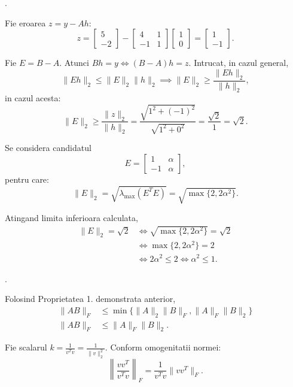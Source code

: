 \begin{demonstratie}

    .

    Fie eroarea $z = y - Ah$:
    $$ z = \begin{bmatrix} 5 \\ -2 \end{bmatrix} - \begin{bmatrix} 4 & 1 \\ -1 & 1 \end{bmatrix} \begin{bmatrix} 1 \\ 0 \end{bmatrix} = \begin{bmatrix} 1 \\ -1 \end{bmatrix}. $$

    Fie $E = B-A$. Atunci $Bh=y \iff (B-A)h = z$. Intrucat, in cazul general,
    $$ \|Eh\|_2 \le \|E\|_2 \|h\|_2 \implies \|E\|_2 \ge \frac{\|Eh\|_2}{\|h\|_2}, $$
    in cazul acesta:
    $$ \|E\|_2 \ge \frac{\|z\|_2}{\|h\|_2} = \frac{\sqrt{1^2 + (-1)^2}}{\sqrt{1^2 + 0^2}} = \frac{\sqrt{2}}{1} = \sqrt{2}. $$

    Se considera candidatul
    $$ E = \begin{bmatrix} 1 & \alpha \\ -1 & \alpha \end{bmatrix}, $$
    pentru care:
    $$ \|E\|_2 = \sqrt{\lambda_{\max}(E^T E)} = \sqrt{\max\{2, 2\alpha^2\}}. $$

    Atingand limita inferioara calculata, 
    \begin{align*}
    \|E\|_2 = \sqrt{2} &\iff \sqrt{\max\{2, 2\alpha^2\}} = \sqrt{2} \\
    &\iff \max\{2, 2\alpha^2\} = 2 \\
    &\iff 2\alpha^2 \le 2 \iff \alpha^2 \le 1. 
    \end{align*}

    .

    Folosind Proprietatea 1. demonstrata anterior, 
    \begin{align*}
    \|AB\|_F &\le \min \{ \|A\|_2 \|B\|_F, \|A\|_F \|B\|_2 \} \\
    \|AB\|_F &\le \|A\|_F \|B\|_2.
    \end{align*}

    Fie scalarul $k = \frac{1}{v^T v} = \frac{1}{\|v\|_2^2}$. Conform omogenitatii normei:
    $$ \left\| \frac{vv^T}{v^T v} \right\|_F = \frac{1}{v^T v} \|v v^T\|_F. $$


\end{demonstratie}
